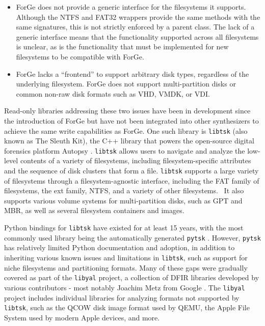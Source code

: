 \begin{itemize}
\tightlist
\item
  ForGe does not provide a generic interface for the filesystems it
  supports. Although the NTFS and FAT32 wrappers provide the same
  methods with the same signatures, this is not strictly enforced by a
  parent class. The lack of a generic interface means that the
  functionality supported across all filesystems is unclear, as is the
  functionality that must be implemented for new filesystems to be
  compatible with ForGe.
\item
  ForGe lacks a ``frontend'' to support arbitrary disk types, regardless
  of the underlying filesystem. ForGe does not support multi-partition
  disks or common non-raw disk formats such as VHD, VMDK, or VDI.
\end{itemize}

Read-only libraries addressing these two issues have been in development
since the introduction of ForGe but have not been integrated into other
synthesizers to achieve the same write capabilities as ForGe. One such
library is \passthrough{\lstinline!libtsk!} (also known as The Sleuth
Kit), the C++ library that powers the open-source digital forensics
platform Autopsy \cite{SleuthkitSleuthkit2025}.
\passthrough{\lstinline!libtsk!} allows users to navigate and analyze
the low-level contents of a variety of filesystems, including
filesystem-specific attributes and the sequence of disk clusters that
form a file. \passthrough{\lstinline!libtsk!} supports a large variety
of filesystems through a filesystem-agnostic interface, including the
FAT family of filesystems, the ext family, NTFS, and a variety of other
filesystems. ~It also supports various volume systems for
multi-partition disks, such as GPT and MBR, as well as several
filesystem containers and images.

Python bindings for \passthrough{\lstinline!libtsk!} have existed for at
least 15 years, with the most commonly used library being the
automatically generated \passthrough{\lstinline!pytsk!}
\cite{Py4n6Pytsk2025}. However, \passthrough{\lstinline!pytsk!} has
relatively limited Python documentation and adoption, in addition to
inheriting various known issues and limitations in
\passthrough{\lstinline!libtsk!}, such as support for niche filesystems
and partitioning formats. Many of these gaps were gradually covered as
part of the \passthrough{\lstinline!libyal!} project, a collection of
DFIR libraries developed by various contributors - most notably Joachim
Metz from Google \cite{LibyalLibyal2025}. The
\passthrough{\lstinline!libyal!} project includes individual libraries
for analyzing formats not supported by \passthrough{\lstinline!libtsk!},
such as the QCOW disk image format used by QEMU, the Apple File System
used by modern Apple devices, and more.


